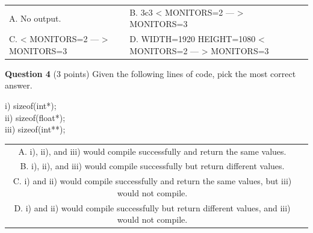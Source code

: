 \documentclass{exam}
\begin{document}
\begin{center}

\begin{tabular} { p{3in}  p{3in} } 
  A.  No output. & B. \newline 3c3 \newline < MONITORS=2 \newline --- \newline > MONITORS=3 \newline \\

  C.  \newline < MONITORS=2 \newline --- \newline > MONITORS=3 & D. \newline WIDTH=1920 \newline HEIGHT=1080 \newline < MONITORS=2 \newline --- \newline > MONITORS=3 \\
\end{tabular}

\end{center}

\vspace{10px}

\textbf{Question 4} (3 points) Given the following lines of code, pick the most correct answer.

\begin{center}
i) sizeof(int*);\\
ii) sizeof(float*);\\
iii) sizeof(int**);\\
\end{center}

\begin{center}

\begin{tabular} { c  c } 
  A. i), ii), and iii) would compile successfully and return the same values.\\
  B. i), ii), and iii) would compile successfully but return different values. \\ 
  C. i) and ii) would compile successfully and return the same values, but iii) would not compile. \\ 
  D. i) and ii) would compile successfully but return different values, and iii) would not compile.
\end{tabular}

\end{center}
\end{document}
